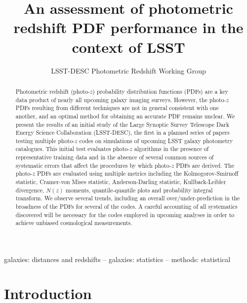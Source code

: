 \documentclass[usenatbib]{mn2e}
\title{An assessment of photometric redshift PDF performance in the context of LSST}
\author{LSST-DESC Photometric Redshift Working Group}
\newcommand{\red}[1]{\textcolor{red}{#1}}
\newcommand{\aim}[1]{\textcolor{green}{#1}}%
\newcommand{\blue}[1]{\textcolor{blue}{#1}}%
\newcommand{\scc}[1]{\textcolor{scc}{#1}}%
\newcommand{\jan}[1]{\textcolor{orange}{#1}}%
\begin{document}
\maketitle

\begin{abstract}
Photometric redshift (photo-$z$) probability distribution functions (PDFs) are a key data product of nearly all upcoming galaxy imaging surveys.
However, the photo-$z$ PDFs resulting from different techniques are not in general consistent with one another, and an optimal method for obtaining an accurate PDF remains unclear.  
We present the results of an initial study of the Large Synoptic Survey Telescope Dark Energy Science Collaboration (LSST-DESC), the first in a planned series of papers testing multiple photo-$z$ codes on simulations of upcoming LSST galaxy photometry catalogues.  This initial test evaluates photo-$z$ algorithms in the presence of representative training data and in the absence of several common sources of systematic errors that affect the procedures by which photo-$z$ PDFs are derived.  
The photo-$z$ PDFs are evaluated using multiple metrics including the Kolmogorov-Smirnoff statistic, Cramer-von Mises statistic, Anderson-Darling statistic, Kullback-Leibler divergence, $N(z)$ moments, quantile-quantile plots and probability integral transform.  We observe several trends, including an overall over/under-prediction in the broadness of the PDFs for several of the codes.  A careful accounting of all systematics discovered will be necessary for the codes employed in upcoming analyses in order to achieve unbiased cosmological measurements.
\end{abstract}
\begin{keywords}
galaxies: distances and redshifts -- galaxies: statistics -- methods: statistical
\end{keywords}


%

\section{Introduction}
\label{sec:intro}
\end{document}

